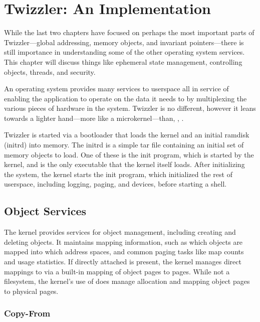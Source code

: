 
\chapter{Twizzler: An Implementation}\label{ch:twizzler}

\begin{chabstract}
    While the last two chapters have focused on perhaps the most important parts of Twizzler---global addressing, memory
    objects, and invariant pointers---there is still importance in understanding some of the other operating system
    services. This chapter will discuss things like ephemeral state management, controlling objects, threads, and security.
\end{chabstract}

An operating system provides many services to userspace all in service of enabling the application to operate on the
data it needs to by multiplexing the various pieces of hardware in the system. Twizzler is no different, however it
leans towards a lighter hand---more like a microkernel---than, \eg, \unix.

Twizzler is started via a bootloader that loads the kernel and an initial ramdisk (initrd) into memory. The initrd is a
simple tar file containing an initial set of memory objects to load. One of these is the init program, which is started
by the kernel, and is the only executable that the kernel itself loads. After initializing the system, the kernel starts
the init program, which initialized the rest of userspace, including logging, paging, and devices, before starting a shell.

\section{Object Services}

The kernel provides services for object management, including creating and deleting objects. It maintains mapping
information, such as which objects are mapped into which address spaces, and common paging tasks like map counts and
usage statistics. If directly attached \NVM is present, the kernel manages direct mappings to \NVM via a built-in
mapping of object pages to \NVM pages. While not a filesystem, the kernel's use of \NVM does manage allocation and
mapping object pages to physical pages.

\subsection{Copy-From}

